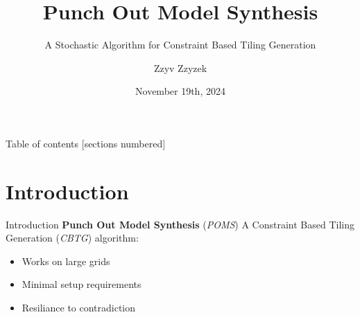 \documentclass{beamer}
\title{Punch Out Model Synthesis}
\subtitle{A Stochastic Algorithm for Constraint Based Tiling Generation}
\date{November 19th, 2024}
\author{Zzyv Zzyzek}
\begin{document}
\newcommand{\specialcell}[2][c]{\begin{tabular}[#1]{@{}l@{}}#2\end{tabular}}
\newcommand{\specialcellCenter}[2][c]{\begin{tabular}[#1]{@{}c@{}}#2\end{tabular}}


  \maketitle


  \begin{frame}{Table of contents}
    [sections numbered]
    \tableofcontents[hideallsubsections]
  \end{frame}

  \section{Introduction}

  \begin{frame}[fragile]{Introduction}
    \textbf{Punch Out Model Synthesis} (\textit{POMS})
    A Constraint Based Tiling Generation (\textit{CBTG}) algorithm:
    \begin{itemize}
      \item Works on large grids
      \item Minimal setup requirements
      \item Resiliance to contradiction
    \end{itemize}

  \end{frame}



\end{document}
